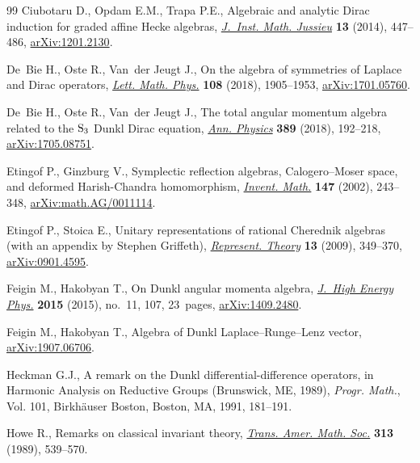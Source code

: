 \documentclass[10pt,a4paper]{amsart}
\numberwithin{equation}{section}
\begin{document}
\begin{thebibliography}{99}
Ciubotaru D., Opdam E.M., Trapa P.E., Algebraic and analytic {D}irac induction
 for graded affine {H}ecke algebras, \href{https://doi.org/10.1017/S147474801300008X}{\textit{J.~Inst. Math. Jussieu}}
 \textbf{13} (2014), 447--486, \href{https://arxiv.org/abs/1201.2130}{arXiv:1201.2130}.

De~Bie H., Oste R., Van~der Jeugt J., On the algebra of symmetries of {L}aplace
 and {D}irac operators, \href{https://doi.org/10.1007/s11005-018-1065-0}{\textit{Lett. Math. Phys.}} \textbf{108} (2018),
 1905--1953, \href{https://arxiv.org/abs/1701.05760}{arXiv:1701.05760}.

De~Bie H., Oste R., Van~der Jeugt J., The total angular momentum algebra
 related to the {${\rm S}_3$} {D}unkl {D}irac equation, \href{https://doi.org/10.1016/j.aop.2017.12.015}{\textit{Ann. Physics}}
 \textbf{389} (2018), 192--218, \href{https://arxiv.org/abs/1705.08751}{arXiv:1705.08751}.

Etingof P., Ginzburg V., Symplectic reflection algebras, {C}alogero--{M}oser
 space, and deformed {H}arish-{C}handra homomorphism, \href{https://doi.org/10.1007/s002220100171}{\textit{Invent. Math.}}
 \textbf{147} (2002), 243--348, \href{https://arxiv.org/abs/math.AG/0011114}{arXiv:math.AG/0011114}.

Etingof P., Stoica E., Unitary representations of rational {C}herednik algebras
 (with an appendix by {S}tephen {G}riffeth), \href{https://doi.org/10.1090/S1088-4165-09-00356-2}{\textit{Represent. Theory}}
 \textbf{13} (2009), 349--370, \href{https://arxiv.org/abs/0901.4595}{arXiv:0901.4595}.

Feigin M., Hakobyan T., On {D}unkl angular momenta algebra, \href{https://doi.org/10.1007/JHEP11(2015)107}{\textit{J.~High
 Energy Phys.}} \textbf{2015} (2015), no.~11, 107, 23~pages,
 \href{https://arxiv.org/abs/1409.2480}{arXiv:1409.2480}.

Feigin M., Hakobyan T., Algebra of {D}unkl {L}aplace--{R}unge--{L}enz vector,
 \href{https://arxiv.org/abs/1907.06706}{arXiv:1907.06706}.

Heckman G.J., A remark on the {D}unkl differential-difference operators, in
 Harmonic Analysis on Reductive Groups ({B}runswick, {ME}, 1989),
 \textit{Progr. Math.}, Vol. 101, Birkh\"auser Boston, Boston, MA, 1991,
 181--191.

Howe R., Remarks on classical invariant theory, \href{https://doi.org/10.2307/2001418}{\textit{Trans. Amer. Math.
 Soc.}} \textbf{313} (1989), 539--570.


\end{thebibliography}
\end{document}

